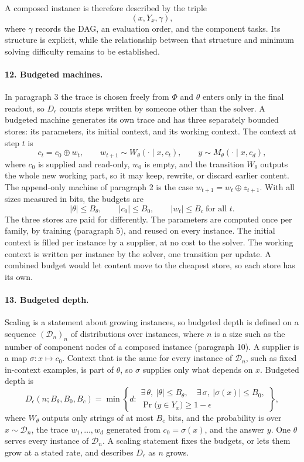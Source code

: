 \documentclass[11pt]{article}
\begin{document}
A composed instance is therefore described by the triple
\[
\boxed{(x,Y_x,\gamma),}
\]
where $\gamma$ records the DAG, an evaluation order, and the component
tasks. Its structure is explicit, while the relationship between that
structure and minimum solving difficulty remains to be established.

\paragraph{12. Budgeted machines.}
In paragraph 3 the trace is chosen freely from $\Phi$ and $\theta$ enters
only in the final readout, so $D_\epsilon$ counts steps written by
someone other than the solver. A budgeted machine generates its own
trace and has three separately bounded stores: its parameters, its
initial context, and its working context. The context at step $t$ is
\[
c_t=c_0\oplus w_t,
\qquad
w_{t+1}\sim W_\theta(\cdot\mid x,c_t),
\qquad
y\sim M_\theta(\cdot\mid x,c_d),
\]
where $c_0$ is supplied and read-only, $w_0$ is empty, and the
transition $W_\theta$ outputs the whole new working part, so it may keep,
rewrite, or discard earlier content. The append-only machine of
paragraph 2 is the case $w_{t+1}=w_t\oplus z_{t+1}$. With all sizes
measured in bits, the budgets are
\[
|\theta|\leq B_\theta,
\qquad
|c_0|\leq B_0,
\qquad
|w_t|\leq B_c\ \text{for all }t.
\]
The three stores are paid for differently. The parameters are computed
once per family, by training (paragraph 5), and reused on every
instance. The initial context is filled per instance by a supplier, at
no cost to the solver. The working context is written per instance by
the solver, one transition per update. A combined budget would let
content move to the cheapest store, so each store has its own.

\paragraph{13. Budgeted depth.}
Scaling is a statement about growing instances, so budgeted depth is
defined on a sequence $(\mathcal D_n)_n$ of distributions over
instances, where $n$ is a size such as the number of component nodes of
a composed instance (paragraph 10). A supplier is a map
$\sigma:x\mapsto c_0$. Context that is the same for every instance of
$\mathcal D_n$, such as fixed in-context examples, is part of $\theta$,
so $\sigma$ supplies only what depends on $x$. Budgeted depth is
\[
D_\epsilon(n;B_\theta,B_0,B_c)
=
\min\left\{
d:
\begin{array}{l}
\exists\,\theta,\ |\theta|\leq B_\theta,\quad
\exists\,\sigma,\ |\sigma(x)|\leq B_0,\\
\Pr\big(y\in Y_x\big)\geq1-\epsilon
\end{array}
\right\},
\]
where $W_\theta$ outputs only strings of at most $B_c$ bits, and the
probability is over $x\sim\mathcal D_n$, the trace $w_1,\ldots,w_d$
generated from $c_0=\sigma(x)$, and the answer $y$. One $\theta$ serves
every instance of $\mathcal D_n$. A scaling statement fixes the budgets,
or lets them grow at a stated rate, and describes $D_\epsilon$ as $n$
grows.
\end{document}
